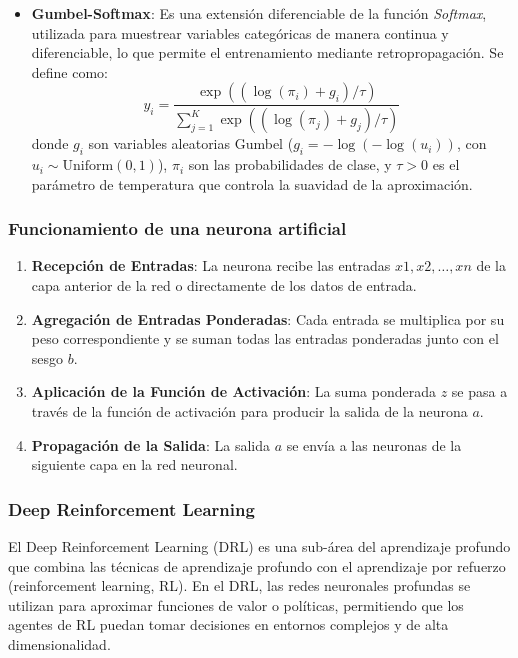 \begin{enumerate}
\begin{itemize}
        \item \textbf{Gumbel-Softmax}: Es una extensión diferenciable de la función \textit{Softmax}, utilizada para muestrear variables categóricas de manera continua y diferenciable, lo que permite el entrenamiento mediante retropropagación. Se define como:
        \[
        y_i = \frac{\exp\left((\log(\pi_i) + g_i)/\tau\right)}{\sum_{j=1}^{K} \exp\left((\log(\pi_j) + g_j)/\tau\right)}
        \]
        donde \(g_i\) son variables aleatorias Gumbel (\(g_i = -\log(-\log(u_i))\), con \(u_i \sim \text{Uniform}(0,1)\)), \(\pi_i\) son las probabilidades de clase, y \(\tau > 0\) es el parámetro de temperatura que controla la suavidad de la aproximación.
    \end{itemize}
\end{enumerate}

\subsubsection{Funcionamiento de una neurona artificial}

\begin{enumerate}
\item \textbf{Recepción de Entradas}: La neurona recibe las entradas \(x1,x2,…,xn\) de la capa anterior de la red o directamente de los datos de entrada.

\item \textbf{Agregación de Entradas Ponderadas}: Cada entrada se multiplica por su peso correspondiente y se suman todas las entradas ponderadas junto con el sesgo \(b\).

\item \textbf{Aplicación de la Función de Activación}: La suma ponderada \(z\) se pasa a través de la función de activación para producir la salida de la neurona \(a\).

\item \textbf{Propagación de la Salida}: La salida \(a\) se envía a las neuronas de la siguiente capa en la red neuronal.
\end{enumerate}

\subsubsection{Deep Reinforcement Learning}

El Deep Reinforcement Learning (DRL) es una sub-área del aprendizaje profundo que combina las técnicas de aprendizaje profundo con el aprendizaje por refuerzo (reinforcement learning, RL). En el DRL, las redes neuronales profundas se utilizan para aproximar funciones de valor o políticas, permitiendo que los agentes de RL puedan tomar decisiones en entornos complejos y de alta dimensionalidad.

